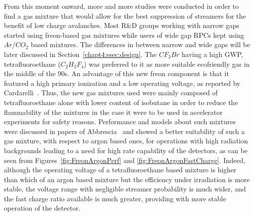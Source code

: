 	From this moment onward, more and more studies were conducted in order to find a gas mixture that would allow for the best suppression of streamers for the benefit of low charge avalanches. Most R\&D groups working with narrow gaps started using freon-based gas mixtures while users of wide gap RPCs kept using $Ar$/$CO_2$ based mixtures. The differences in between narrow and wide gaps will be later discussed in Section~\ref{chapt4:ssec:design}. The $CF_3Br$ having a high GWP, tetrafluoroethane ($C_2H_2F_4$) was preferred to it as more suitable ecofriendly gas in the middle of the 90s. An advantage of this new freon component is that it featured a high primary ionization and a low operating voltage, as reported by Cardarelli~\cite{CARDARELLI96}. Thus, the new gas mixtures used were mainly composed of tetrafluoroethane alone with lower content of isobutane in order to reduce the flammability of the mixtures in the case it were to be used in accelerator experiments for safety reasons. Performance and models about such mixtures were discussed in papers of Abbrescia~\cite{ABBRESCIA1997PERF,ABBRESCIA1997} and showed a better suitability of such a gas mixture, with respect to argon based ones, for operations with high radiation backgrounds leading to a need for high rate capability of the detectors, as can be seen from Figures~\ref{fig:FreonArgonPerf} and \ref{fig:FreonArgonFastCharge}. Indeed, although the operating voltage of a tetrafluoroethane based mixture is higher than which of an argon based mixture but the efficiency under irradiation is more stable, the voltage range with negligible streamer probability is much wider, and the fast charge ratio available is much greater, providing with more stable operation of the detector.
	
